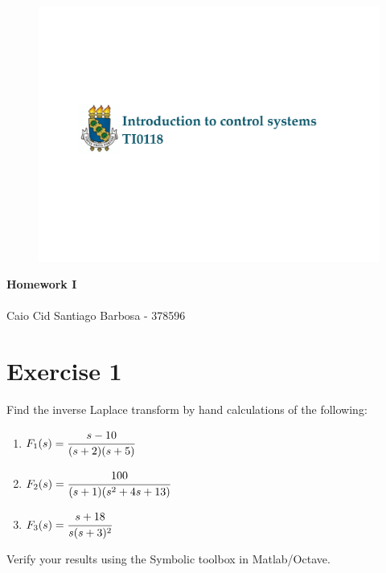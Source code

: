 \documentclass[a4paper,11pt]{article}
\begin{document}
\begin{figure}[!h] \includegraphics [scale=0.3] {Course_logo} \end{figure}
{\Large \noindent \bf Homework I}\\
 
\\ Caio Cid Santiago Barbosa - 378596
\vskip0.8cm

\section*{Exercise 1} 
Find the inverse Laplace transform by hand calculations of the following:
\begin{enumerate}
\item $F_1(s)=\cfrac{s-10}{(s+2)(s+5)}$ 
\item $F_2(s)=\cfrac{100}{(s+1)(s^2+4s+13)}$ 
\item $F_3(s)=\cfrac{s+18}{s(s+3)^2}$ 
\end{enumerate}

\noindent  Verify your results using the Symbolic toolbox in Matlab/Octave.\\


\end{document}
